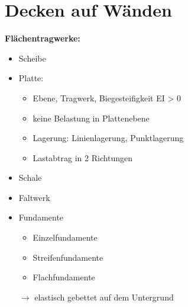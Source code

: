 \section{Decken auf Wänden}

	\begin{minipage}{0.5\linewidth}
		
		\textbf{Flächentragwerke:}
			
			\begin{itemize}
				
				\item Scheibe
				
				\item Platte:
					
					\begin{itemize}
						
						\item Ebene, Tragwerk, Biegesteifigkeit EI > 0
						
						\item keine Belastung in Plattenebene
						
						\item Lagerung: Linienlagerung, Punktlagerung
						
						\item Lastabtrag in 2 Richtungen
						
					\end{itemize}
										
				
			\end{itemize}
		
		
	\end{minipage}
	\begin{minipage}{0.5\linewidth}
		
		\begin{itemize}
			
			\item Schale
			
			\item Faltwerk
			
			\item Fundamente
			
			\begin{itemize}
				
				\item Einzelfundamente
				
				\item Streifenfundamente
				
				\item Flachfundamente
				
			\end{itemize}
			$ \rightarrow $ elastisch gebettet auf dem Untergrund
			
			
		\end{itemize}
		
	\end{minipage}

